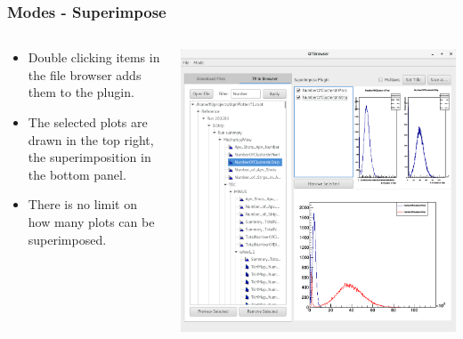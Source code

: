 \documentclass{beamer}
\begin{document}
\begin{frame}
\frametitle{Modes - Superimpose}
  \begin{columns}[T]
    \begin{column}{.5\textwidth}
     \begin{block}{}
     \begin{itemize}
     \item Double clicking items in the file browser adds them to the plugin.
     \item The selected plots are drawn in the top right, the superimposition in the bottom panel.
     \item There is no limit on how many plots can be superimposed.
     \end{itemize}
   	\end{block}	
    \end{column}
    \begin{column}{.5\textwidth}
    \begin{block}{}
    \includegraphics[width=\textwidth]{figures/superimpose.png}
    \end{block}
    \end{column}
  \end{columns}
\end{frame}
\end{document}

